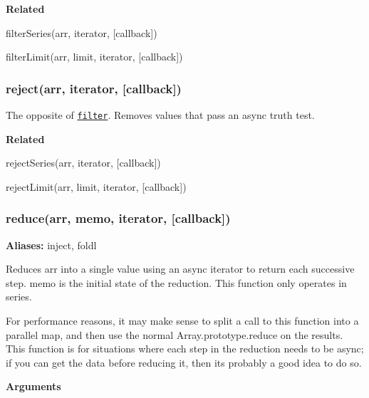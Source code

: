 {\bfseries Related}


\begin{DoxyItemize}
\item filter\+Series(arr, iterator, \mbox{[}callback\mbox{]})
\item filter\+Limit(arr, limit, iterator, \mbox{[}callback\mbox{]}) 


\end{DoxyItemize}

\label{_reject}%
 \subsubsection*{reject(arr, iterator, \mbox{[}callback\mbox{]})}

The opposite of \href{#filter}{\tt {\ttfamily filter}}. Removes values that pass an {\ttfamily async} truth test.

{\bfseries Related}


\begin{DoxyItemize}
\item reject\+Series(arr, iterator, \mbox{[}callback\mbox{]})
\item reject\+Limit(arr, limit, iterator, \mbox{[}callback\mbox{]}) 


\end{DoxyItemize}

\label{_reduce}%
 \subsubsection*{reduce(arr, memo, iterator, \mbox{[}callback\mbox{]})}

{\bfseries Aliases\+:} {\ttfamily inject}, {\ttfamily foldl}

Reduces {\ttfamily arr} into a single value using an async {\ttfamily iterator} to return each successive step. {\ttfamily memo} is the initial state of the reduction. This function only operates in series.

For performance reasons, it may make sense to split a call to this function into a parallel map, and then use the normal {\ttfamily Array.\+prototype.\+reduce} on the results. This function is for situations where each step in the reduction needs to be async; if you can get the data before reducing it, then it\textquotesingle{}s probably a good idea to do so.

{\bfseries Arguments}


